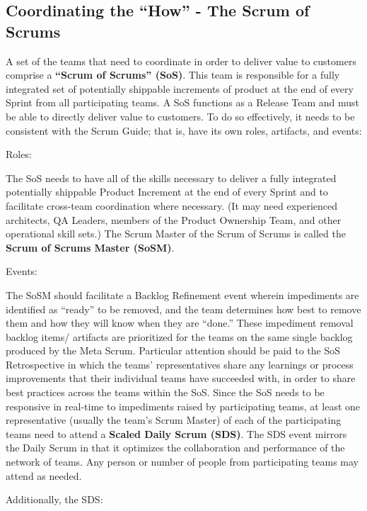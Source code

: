 \documentclass[12pt,a4paper,parskip=full]{scrartcl}
\begin{document}
\subsection{Coordinating the ``How'' - The Scrum of Scrums}
A set of the teams that need to coordinate in order to deliver value to customers comprise a \textbf{``Scrum of Scrums'' (SoS)}. This team  is responsible for a fully integrated set of potentially shippable increments of product at the end of every Sprint from all participating teams. A SoS functions as a Release Team and must be able to directly deliver value to customers. To do so effectively, it needs to be consistent with the Scrum Guide; that is, have its own roles, artifacts, and events:

Roles:

The SoS needs to have all of the skills necessary to deliver a fully integrated potentially shippable Product Increment at the end of every Sprint and to facilitate cross-team coordination where necessary. (It may need experienced architects, QA Leaders, members of the Product Ownership Team, and other operational skill sets.) 
The Scrum Master of the Scrum of Scrums is called the \textbf{Scrum of Scrums Master (SoSM)}.

Events:

The SoSM should facilitate a Backlog Refinement event wherein impediments are identified as ``ready'' to be removed, and the team determines how best to remove them and how they will know when they are ``done.'' These impediment removal backlog items/ artifacts are prioritized for the teams on the same single backlog produced by the Meta Scrum. 
Particular attention should be paid to the SoS Retrospective in which the teams' representatives share any learnings or process improvements that their individual teams have succeeded with, in order to share best practices across the teams within the SoS.  
Since the SoS needs to be responsive in real-time to impediments raised by participating teams, at least one representative (usually the team's Scrum Master) of each of the participating teams need to attend a \textbf{Scaled Daily Scrum (SDS)}. The SDS event mirrors the Daily Scrum in that it optimizes the collaboration and performance of the network of teams. Any person or number of people from participating teams may attend as needed.

Additionally, the SDS:
\end{document}
